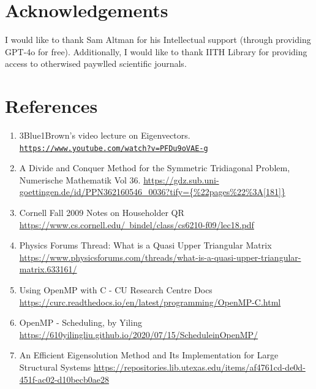 \documentclass[12pt,a4paper]{article}
\begin{document}
\section{Acknowledgements}

I would like to thank Sam Altman for his Intellectual support (through providing GPT-4o for free).
Additionally, I would like to thank IITH Library for providing access to otherwised paywlled scientific journals. 

\section{References}

\begin{enumerate}
    \item 3Blue1Brown's video lecture on Eigenvectors. \href{https://www.youtube.com/watch?v=PFDu9oVAE-g}{\texttt{https://www.youtube.com/watch?v=P\newline FDu9oVAE-g}}
    
    \item A Divide and Conquer Method for the Symmetric Tridiagonal Problem, Numerische Mathematik Vol 36. \href{https://gdz.sub.uni-goettingen.de/id/PPN362160546_0036?tify={\text22pages\%22\%3A[181]}}{https://gdz.sub.uni-goettingen.de/id/PPN362160546\_0036?tify=\newline \{\%22pages\%22\%3A[181]\}}
    
    \item Cornell Fall 2009 Notes on Householder QR \href{https://www.cs.cornell.edu/~bindel/class/cs6210-f09/lec18.pdf}{https://www.cs.cornell.edu/~bindel/class/\newline cs6210-f09/lec18.pdf}
    
    \item Physics Forums Thread: What is a Quasi Upper Triangular Matrix \href{https://www.physicsforums.com/threads/what-is-a-quasi-upper-triangular-matrix.633161/}{https://www.\newline physicsforums.com/threads/what-is-a-quasi-upper-triangular-matrix.633161/}
    
    \item Using OpenMP with C - CU Research Centre Docs \href{https://curc.readthedocs.io/en/latest/programming/OpenMP-C.html}{https://curc.readthedocs.io/en/latest/\newline programming/OpenMP-C.html}

    \item OpenMP - Scheduling, by Yiling \href{https://610yilingliu.github.io/2020/07/15/ScheduleinOpenMP/}{https://610yilingliu.github.io/2020/07/15/Schedulein\newline OpenMP/}

    \item An Efficient Eigensolution Method and Its
    Implementation for Large Structural Systems \href{https://repositories.lib.utexas.edu/items/af4761cd-de0d-451f-ac02-d10becb0ae28}{https://repositories.lib.utexas.edu/items/af4761cd-de0d-451f-ac02-d10becb0ae28}
\end{enumerate}
\end{document}
